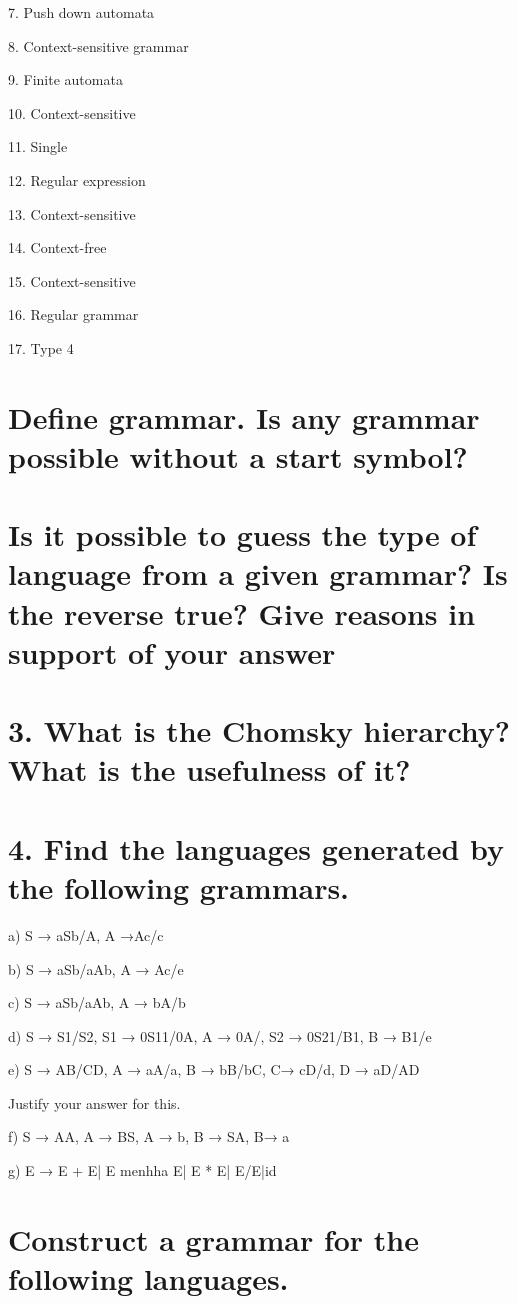 \documentclass[]{article}
\begin{document}
 
 7. Push down automata 
 
 
 8. Context-sensitive grammar
 
  
 9. Finite automata
 
 
10. Context-sensitive 


11. Single 



12. Regular expression


13. Context-sensitive 


14. Context-free 


15. Context-sensitive


16. Regular grammar 


17. Type 4 


\section{Define grammar. Is any grammar possible without a start symbol?}

\section{Is it possible to guess the type of language from a given grammar? Is the reverse true? Give reasons in support of your answer}


\section{3. What is the Chomsky hierarchy? What is the usefulness of it?}

\section{4. Find the languages generated by the following grammars.}


a) S → aSb/A, A →Ac/c
 
 
 b) S → aSb/aAb, A → Ac/e


 c) S → aSb/aAb, A → bA/b
 
 
 d) S → S1/S2, S1 → 0S11/0A, A → 0A/, S2 → 0S21/B1, B → B1/e
 
 
 e) S → AB/CD, A → aA/a, B → bB/bC, C→ cD/d, D → aD/AD
 
 
 Justify your answer for this.
 
 
 f) S → AA, A → BS, A → b, B → SA, B→ a
 
 
 g) E → E + E| E menhha E| E * E| E/E|id
 
 \section{Construct a grammar for the following languages.}
\end{document}

